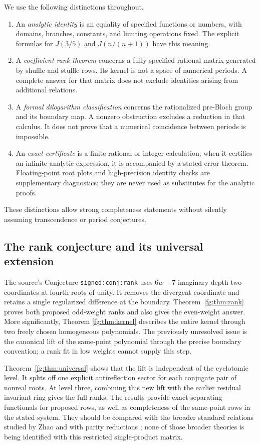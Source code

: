 We use the following distinctions throughout.
\begin{enumerate}
\item An \emph{analytic identity} is an equality of specified functions
or numbers, with domains, branches, constants, and limiting operations
fixed. The explicit formulas for $J(3/5)$ and $J(n/(n+1))$ have this
meaning.
\item A \emph{coefficient-rank theorem} concerns a fully specified
rational matrix generated by shuffle and stuffle rows. Its kernel is
not a space of numerical periods. A complete answer for that matrix
does not exclude identities arising from additional relations.
\item A \emph{formal dilogarithm classification} concerns the
rationalized pre-Bloch group and its boundary map. A nonzero obstruction
excludes a reduction in that calculus. It does not prove that a
numerical coincidence between periods is impossible.
\item An \emph{exact certificate} is a finite rational or integer
calculation; when it certifies an infinite analytic expression, it is
accompanied by a stated error theorem. Floating-point root
plots and high-precision identity checks are supplementary diagnostics;
they are never used as substitutes for the analytic proofs.
\end{enumerate}
These distinctions allow strong completeness statements without
silently assuming transcendence or period conjectures.

\subsection{The rank conjecture and its universal extension}

The source's Conjecture \texttt{signed:conj:rank} uses $6w-7$ imaginary
depth-two coordinates at fourth roots of unity. It removes the divergent
coordinate and retains a single regularized difference at the boundary.
Theorem~\ref{fg:thm:rank} proves both proposed odd-weight ranks and also
gives the even-weight answer. More significantly, Theorem
\ref{fg:thm:kernel} describes the entire kernel through two freely
chosen homogeneous polynomials. The previously unresolved issue is the
canonical lift of the same-point polynomial through the precise
boundary convention; a rank fit in low weights cannot supply this step.

Theorem~\ref{fg:thm:universal} shows that the lift is independent of the
cyclotomic level. It splits off one explicit antireflection sector for
each conjugate pair of nonreal roots. At level three, combining this
new lift with the earlier residual invariant ring gives the full ranks.
The results provide exact separating functionals for proposed rows,
as well as completeness of the same-point rows in the stated system.
They should be compared with the broader standard relations studied
by Zhao \cite{Zhao2010} and with parity reductions
\cite{Panzer2017,Umezawa2025}; none of those broader theories is being
identified with this restricted single-product matrix.

